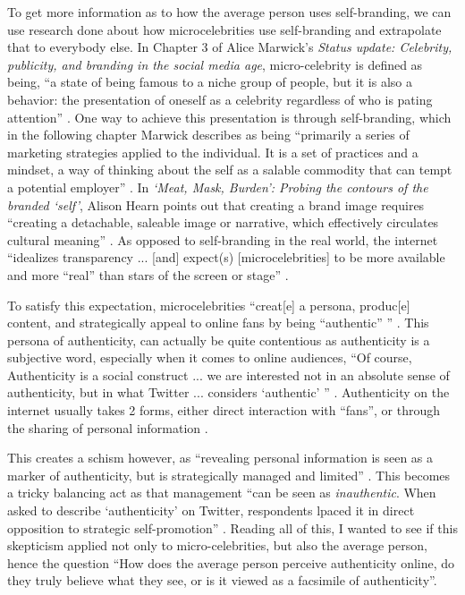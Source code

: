 \documentclass[12pt]{article}
\begin{document}
\begin{doublespace}
    \par To get more information as to how the average person uses self-branding, we can use research done about how microcelebrities use self-branding and extrapolate that to everybody else.
        In Chapter 3 of Alice Marwick's \textit{Status update: Celebrity, publicity, and branding in the social media age}, micro-celebrity is defined as being, ``a state of being famous to a niche group of people, but it is also a behavior: the presentation of oneself as a celebrity regardless of who is pating attention'' \autocite*[114]{Marwick1}.
        One way to achieve this presentation is through self-branding, which in the following chapter Marwick describes as being ``primarily a series of marketing strategies applied to the individual. It is a set of practices and a mindset, a way of thinking about the self as a salable commodity that can tempt a potential employer'' \autocite*[166]{Marwick2}.
        In \textit{`Meat, Mask, Burden': Probing the contours of the branded `self'}, Alison Hearn points out that creating a brand image requires ``creating a detachable, saleable image or narrative, which effectively circulates cultural meaning'' \autocite*[198]{Hearn1}.
        As opposed to self-branding in the real world, the internet ``idealizes transparency ... [and] expect(s) [microcelebrities] to be more available and more ``real'' than stars of the screen or stage'' \autocite[114]{Marwick1}.
    \par To satisfy this expectation, microcelebrities ``creat[e] a persona, produc[e] content, and strategically appeal to online fans by being ``authentic'' '' \autocite[114]{Marwick1}.
        This persona of authenticity, can actually be quite contentious as authenticity is a subjective word, especially when it comes to online audiences, ``Of course, Authenticity is a social construct ... we are interested not in an absolute sense of authenticity, but in what Twitter ... considers `authentic' '' \autocite[119]{MB1}.
        Authenticity on the internet usually takes 2 forms, either direct interaction with ``fans'', or through the sharing of personal information \autocite[114]{Marwick1}.
    \par This creates a schism however, as ``revealing personal information is seen as a marker of authenticity, but is strategically managed and limited'' \autocite[127]{MB1}.
        This becomes a tricky balancing act as that management ``can be seen as \textit{inauthentic}. When asked to describe `authenticity' on Twitter, respondents lpaced it in direct opposition to strategic self-promotion'' \autocite[127]{MB1}.
        Reading all of this, I wanted to see if this skepticism applied not only to micro-celebrities, but also the average person, hence the question ``How does the average person perceive authenticity online, do they truly believe what they see, or is it viewed as a facsimile of authenticity''.


\end{doublespace}
\end{document}
